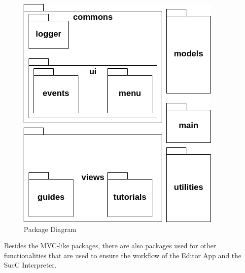 \documentclass[12pt,a4paper,twoside]{report}
\begin{document}
\begin{figure}[h]
 \centering
 \includegraphics[scale=0.5]{img/diags/packagediag.png}
 \caption{Package Diagram}
\end{figure}

Besides the MVC-like packages, there are also packages used for other functionalities that are used to ensure the workflow of the Editor App and the SueC Interpreter.
\end{document}
